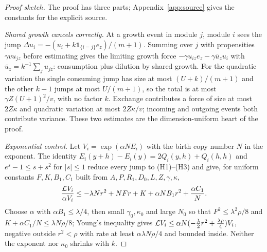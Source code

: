 \begin{proof}[Proof sketch]
The proof has three parts; Appendix~\ref{app:source} gives the constants for the explicit source.

\emph{Shared growth cancels correctly.} At a growth event in module $j$, module $i$ sees the jump $\Delta u_i=-(u_i+k\mathbf1_{\{i=j\}}e_z)/(m+1)$. Summing over $j$ with propensities $\gamma vu_{jz}$ before estimating gives the limiting growth force $-\gamma u_{iz}e_z-\gamma\bar u_zu_i$ with $\bar u_z=k^{-1}\sum_ju_{jz}$: consumption plus dilution by shared growth. For the quadratic variation the single consuming jump has size at most $(U+k)/(m+1)$ and the other $k-1$ jumps at most $U/(m+1)$, so the total is at most $\gamma Z(U+1)^2/v$, with no factor $k$. Exchange contributes a force of size at most $2Z\kappa$ and quadratic variation at most $2Z\kappa/v$; incoming and outgoing events both contribute variance. These two estimates are the dimension-uniform heart of the proof.

\emph{Exponential control.} Let $V_i=\exp(\alpha NE_i)$ with the birth copy number $N$ in the exponent. The identity $E_i(y+h)-E_i(y)=2Q_i(y,h)+Q_i(h,h)$ and $e^s-1\le s+s^2$ for $|s|\le1$ reduce every jump to (H1)--(H3) and give, for uniform constants $F,K,B_1,C_1$ built from $A,P,R_1,D_0,L,Z,\gamma,\kappa$,
\[
 \frac{\mathcal L V_i}{\alpha V_i}\le-\lambda Nr^2+NFr+K+\alpha NB_1r^2+\frac{\alpha C_1}N .
\]
Choose $\alpha$ with $\alpha B_1\le\lambda/4$, then small $\gamma_0,\kappa_0$ and large $N_0$ so that $F^2\le\lambda^2\rho/8$ and $K+\alpha C_1/N\le\lambda N\rho/8$; Young's inequality gives $\mathcal L V_i\le\alpha N(-\tfrac\lambda2r^2+\tfrac{\lambda\rho}4)V_i$, negative outside $r^2<\rho$ with rate at least $\alpha\lambda N\rho/4$ and bounded inside. Neither the exponent nor $\kappa_0$ shrinks with $k$.


\end{proof}
